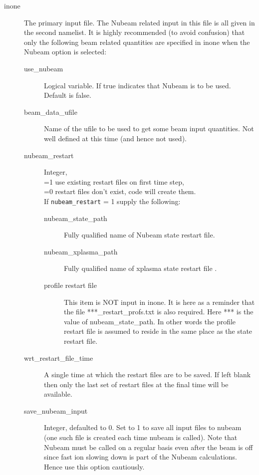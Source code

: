   \begin{description}
    \item[inone] The primary \ot input file. The Nubeam related input
      in this file is all given in the second namelist. It is highly
      recommended (to avoid confusion) that only the following beam
      related quantities are specified in inone when the Nubeam option
      is selected:
      \begin{description}
       \item[use\_nubeam]  Logical variable. If true indicates that
         Nubeam is to be used. Default is false.
        \item[beam\_data\_ufile]  Name of the ufile to be used to get
          some beam input quantities. Not well defined at this time
          (and hence not used).
        
        \item[nubeam\_restart] Integer, \\
        =1  use existing restart files on first time step,\\
                                    =0  restart files don't exist,
                                    code will create them. \\
         If \texttt{nubeam\_restart} = 1 supply the following: 
        \begin{description}
          \item[nubeam\_state\_path]  Fully qualified name of Nubeam state
           restart file.
          \item[nubeam\_xplasma\_path] Fully qualified name of xplasma
           state restart file .
          \item[profile restart file] This item is NOT input in
            inone. It is here as a reminder that the file
            ***\_restart\_profs.txt is also  required. Here *** is the
            value of nubeam\_state\_path. In other words the profile
            restart file is assumed to reside in the same place as the
            state restart file.
      \end{description}
      \item[wrt\_restart\_file\_time ] A single time at which the restart
        files are to be saved. If left blank then only the last set of
        restart files at the final time will be available.


       \item[save\_nubeam\_input] Integer, defaulted to 0.      
                   Set to 1 to save all input files to nubeam (one such
                   file is created each time nubeam is called).
                   Note that Nubeam must be called on a regular basis 
                   even after the beam  is off
                   since fast ion slowing down is part of the 
                   Nubeam calculations. Hence use this option cautiously.



\end{description}
\end{description}
